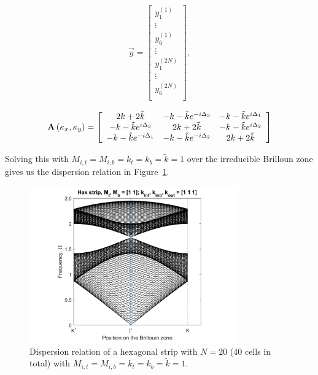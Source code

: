 \begin{align}
\vec{y}=\left[
\begin{array}{c}
y_1^{(1)}\\
\vdots\\
y_6^{(1)}\\
\vdots\\
y_1^{(2N)}\\
\vdots\\
y_6^{(2N)}\\
\end{array}\right],
\end{align}

\begin{align}
  \mathbf{A}\left(\kappa_{x},\kappa_{y}\right)=\left[
\begin{array}{ccc}
2k+2\tilde{k} & -k-\tilde{k}e^{-i\Delta_3} & -k-\tilde{k}e^{i\Delta_1} \\
-k-\tilde{k}e^{i\Delta_3} & 2k+2\tilde{k} & -k-\tilde{k}e^{i\Delta_2} \\
-k-\tilde{k}e^{-i\Delta_1} & -k-\tilde{k}e^{-i\Delta_2} & 2k+2\tilde{k} 
\end{array}\right]
\end{align}

Solving this with $M_{i,t}=M_{i,b}=k_t=k_b=\tilde{k}=1$ over the irreducible
Brilloun zone gives us the dispersion relation in
Figure~\ref{fig:hexstripdisper}.

\begin{figure}[!h]
\centering
\includegraphics[width=0.8\textwidth]{imgs/hexstrip.png}
\caption{\label{fig:hexstripdisper} Dispersion relation of a hexagonal strip
  with $N=20$ (40 cells in total) with $M_{i,t}=M_{i,b}=k_t=k_b=\tilde{k}=1$.}
\end{figure}

